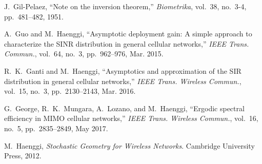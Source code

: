 \documentclass[12pt,draftclsnofoot,journal,onecolumn]{IEEEtran}
\begin{document}
\begin{thebibliography}{10}
	J.~Gil-Pelaez, ``{Note on the inversion theorem},'' {\em Biometrika}, vol.~38, no.~3-4, 
	pp.~481--482, 1951.
	
	A.~Guo and M.~Haenggi, ``{Asymptotic deployment gain: A simple approach to characterize the SINR distribution in general cellular networks},'' {\em IEEE Trans. Commun.}, vol.~64, no.~3, pp.~962--976, Mar. 2015.	
	
	R.~K.~Ganti and M.~Haenggi, ``{Asymptotics and approximation of the SIR distribution in general cellular networks},'' {\em IEEE Trans. Wireless Commun.}, vol.~15, no.~3, pp.~2130--2143, Mar. 2016.	
	
	G.~George, R.~K.~Mungara, A.~Lozano, and M.~Haenggi, ``{Ergodic spectral efficiency in MIMO cellular networks},'' {\em IEEE Trans. Wireless Commun.}, vol.~16, no.~5, pp.~2835--2849, May 2017.	
	
	M.~Haenggi, {\em {Stochastic Geometry for Wireless Networks}}.
	\newblock Cambridge University Press, 2012.		
\end{thebibliography}
\end{document}
